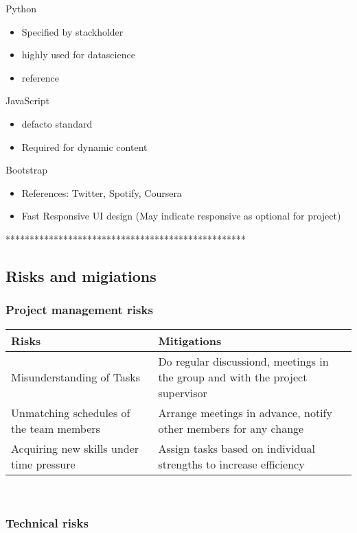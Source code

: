 \documentclass[notitlepage]{article}
\begin{document}
\begin{flushleft}
\large{Python}
\begin{itemize}
	\item Specified by stackholder
	\item highly used for datascience
	\item reference
\end{itemize}

\large{JavaScript}
\begin{itemize}
	\item defacto standard
	\item Required for dynamic content
\end{itemize}

\large{Bootstrap}
\begin{itemize}
	\item References: Twitter, Spotify, Coursera
	\item Fast Responsive UI design (May indicate responsive as optional for project)
\end{itemize}

{\color{gray} **************************************************}


\subsection{Risks and migiations}

\subsubsection{Project management risks}

\begin{tabularx}{12cm}{|X|X|}
\hline
\textbf{Risks} &\textbf{Mitigations}\\
\hline
Misunderstanding of Tasks & Do regular discussiond, meetings in the group and with the project supervisor\\
\hline
Unmatching schedules of the team members & Arrange meetings in advance, notify other members for any change  \\
\hline
Acquiring new skills under time pressure & Assign tasks based on individual strengths to increase efficiency \\ 
\hline
\end{tabularx}\\ 


\subsubsection{Technical risks}


\end{flushleft}
\end{document}

